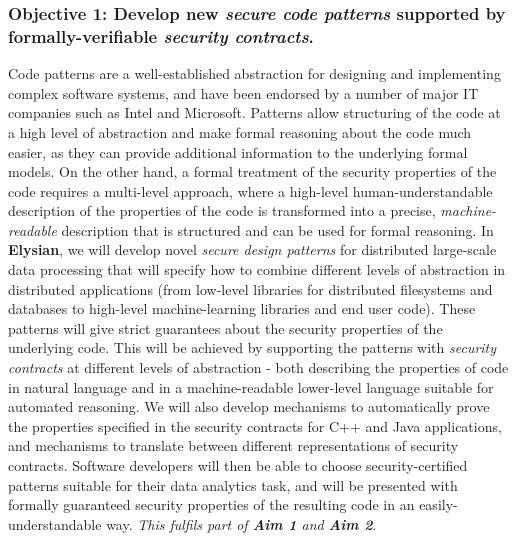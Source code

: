 \documentclass[a4paper,11pt]{article}
\newcommand{\project}[1]{\textbf{#1}\xspace}
\newcommand{\SECURITY}{\project{Elysian}}
\newcommand{\TheProject}{\SECURITY}
\begin{document}
\subsubsection*{Objective 1: Develop new \emph{secure code patterns} supported by formally-verifiable \emph{security contracts}.}
\vspace{-6pt}
Code patterns are a well-established abstraction for designing and implementing complex software systems, and have been endorsed by a number of major IT companies such as Intel and Microsoft. Patterns allow structuring of the code at a high level of abstraction and make formal reasoning about the code much easier, as they can provide additional information to the underlying formal models. On the other hand, a formal treatment of the security properties of the code requires a multi-level approach, where a high-level human-understandable description of the properties of the code is transformed into a precise, \emph{machine-readable} description that is structured and can be used for formal reasoning. In \TheProject{}, we will develop novel \emph{secure design patterns} for distributed large-scale data processing that will specify how to combine different levels of abstraction in distributed applications (from low-level libraries for distributed filesystems and databases to high-level machine-learning libraries and end user code). These patterns will give strict guarantees about the security properties of the underlying code. This will be achieved by supporting the patterns with \emph{security contracts} at different levels of abstraction - both describing the properties of code in natural language and in a machine-readable lower-level language suitable for automated reasoning. We will also develop mechanisms to automatically prove the properties specified in the security contracts for C++ and Java applications, and mechanisms to translate between different representations of security contracts. Software developers will then be able to choose security-certified patterns suitable for their data analytics task, and will be presented with formally guaranteed security properties of the resulting code in an easily-understandable way. \emph{This fulfils part of \textbf{Aim 1} and \textbf{Aim 2}}.
\end{document}
